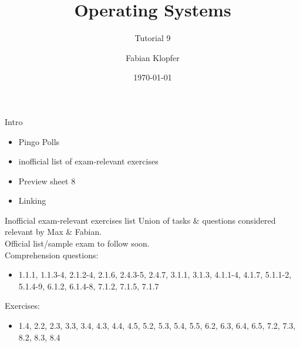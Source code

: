 \documentclass[10pt]{beamer}
\title{\textbf{Operating Systems}}
\subtitle{Tutorial 9}
\author{Fabian Klopfer}
\date{\today}
\begin{document}
\frame{\titlepage}


\begin{frame}{Intro}
\begin{itemize}
 \item Pingo Polls
 \item inofficial list of exam-relevant exercises
 \item Preview sheet 8
 \item Linking
\end{itemize}
\end{frame}

\begin{frame}{\alert{Inofficial} exam-relevant exercises list}
 Union of tasks \& questions considered relevant by Max \& Fabian. \vspace{0.3cm} \\
 Official list/sample exam to follow soon. \vspace{0.5cm} \\
 Comprehension questions: 
  \begin{itemize}
  \item 1.1.1, 1.1.3-4, 2.1.2-4, 2.1.6, 2.4.3-5, 2.4.7, 3.1.1, 3.1.3, 4.1.1-4, 4.1.7, 5.1.1-2, 5.1.4-9, 6.1.2, 6.1.4-8, 7.1.2, 7.1.5, 7.1.7
 \end{itemize}
 
 Exercises:
 \begin{itemize}
  \item 1.4, 2.2, 2.3, 3.3, 3.4, 4.3, 4.4, 4.5, 5.2, 5.3, 5.4, 5.5, 6.2, 6.3, 6.4, 6.5, 7.2, 7.3, 8.2, 8.3, 8.4
 \end{itemize}

\end{frame}
\end{document}
